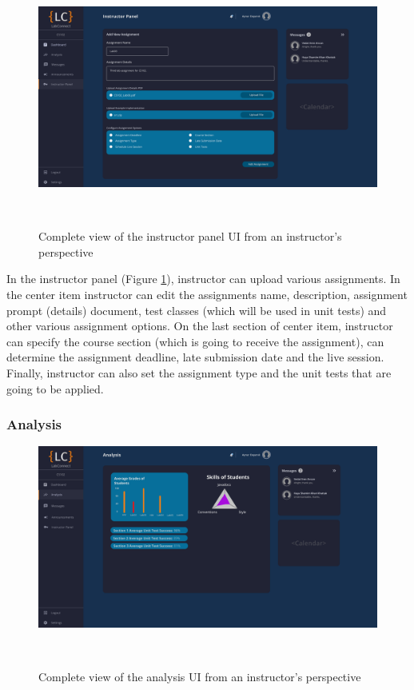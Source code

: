 \documentclass[a4paper, 12pt]{article}
\begin{document}
    \begin{figure}[H]
        \centering
        \includegraphics[width=\textwidth]{instructor_admin_panel}
        \caption{Complete view of the instructor panel UI from an instructor's perspective}~\label{fig:instructor_admin_panel_full}
    \end{figure}

    In the instructor panel (Figure \ref{fig:instructor_admin_panel_full}), instructor can upload various assignments. In the center item instructor can edit the assignments name, description,
    assignment prompt (details) document, test classes (which will be used in unit tests) and other various assignment options. On the last section of center item, instructor can specify the course section
    (which is going to receive the assignment), can determine the assignment deadline, late submission date and the live session. Finally, instructor can also set the assignment type and the unit tests
    that are going to be applied.



    \pagebreak

    \subsubsection{Analysis}

    \begin{figure}[H]
        \centering
        \includegraphics[width=\textwidth]{instructor_analysis}
        \caption{Complete view of the analysis UI from an instructor's perspective}~\label{fig:instructor_analysis_full}
    \end{figure}
\end{document}
